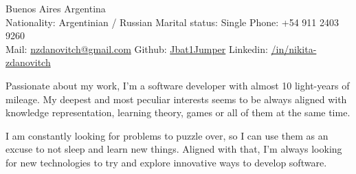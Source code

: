 \documentclass[10pt,a4paper]{article}
\begin{document}
\sloppy



\nobreakvspace{0.3em}

\noindent
Buenos Aires \sbull
Argentina \vspace{3pt} \\
Nationality: Argentinian / Russian \sbull
Marital status: Single \sbull
Phone: +54 911 2403 9260 \vspace{3pt} \\
Mail: \href{mailto:nzdanovitch.at.gmail.dot.com}{nzdanovitch\mbox{}@\mbox{}gmail.com} \sbull
Github: \href{http://github.com/Jbat1Jumper}{Jbat1Jumper} \sbull
Linkedin: \href{https://www.linkedin.com/in/nikita-zdanovitch}{/in/nikita-zdanovitch}


\spacedhrule{1.2em}{-0.4em}  %





\vspace{-1.3em}
\begin{multicols}{2}
\noindent

Passionate about my work, I'm a software developer with almost 10 light-years
of mileage. My deepest and most peculiar interests seems to be always
aligned with knowledge representation, learning theory, games or all of
them at the same time.

I am constantly looking for problems to puzzle over, so I can use them as an
excuse to not sleep and learn new things. Aligned with that, I'm always
looking for new technologies to try and explore innovative ways to develop
software.



% 
% 


%
%

\end{multicols}
\end{document}
